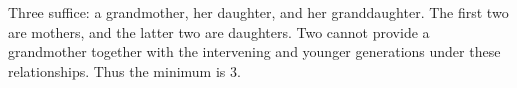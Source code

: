 Three suffice: a grandmother, her daughter, and her granddaughter. The first two are mothers, and the latter two are daughters. Two cannot provide a grandmother together with the intervening and younger generations under these relationships. Thus the minimum is $\boxed3$.
